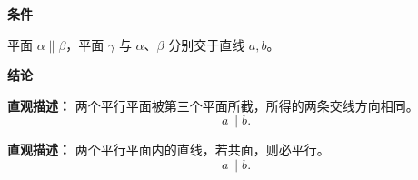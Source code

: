 \begin{statementbox}
	\textbf{\textcolor{CStatement}{条件}}
	\begin{description}[style=nextline, leftmargin=2.8em, labelsep=0.5em, itemsep=0.35em]
		\item[\textbf{\textcolor{CStatement}{条件 1（平行平面被截）：}}] 平面 $\alpha\parallel\beta$，平面 $\gamma$ 与 $\alpha$、$\beta$ 分别交于直线 $a,b$。
	\end{description}

	\textbf{\textcolor{CStatement}{结论}}
	\begin{description}[style=nextline, leftmargin=2.8em, labelsep=0.5em, itemsep=0.45em]
		\item[\textbf{\textcolor{CStatement}{结论一（交线互相平行）：}}]
			\textbf{\textcolor{CStatement}{直观描述：}}
			两个平行平面被第三个平面所截，所得的两条交线方向相同。
			\[
				a\parallel b.
			\]

		\item[\textbf{\textcolor{CStatement}{推广结论（共面线线平行）：}}]
			\textbf{\textcolor{CStatement}{直观描述：}}
			两个平行平面内的直线，若共面，则必平行。
			\[
				a\parallel b.
			\]
	\end{description}
\end{statementbox}
